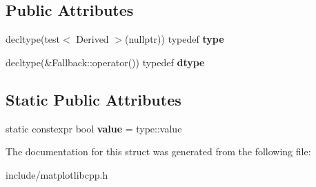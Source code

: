 \subsection*{Public Attributes}
\begin{DoxyCompactItemize}
\item 
decltype(test$<$ Derived $>$(nullptr)) typedef {\bfseries type}\hypertarget{structmatplotlibcpp_1_1detail_1_1is__callable__impl_3_01true_00_01T_01_4_ab3b84ab99dcdc4a7de6497c5b0985216}{}\label{structmatplotlibcpp_1_1detail_1_1is__callable__impl_3_01true_00_01T_01_4_ab3b84ab99dcdc4a7de6497c5b0985216}

\item 
decltype(\&Fallback\+::operator()) typedef {\bfseries dtype}\hypertarget{structmatplotlibcpp_1_1detail_1_1is__callable__impl_3_01true_00_01T_01_4_aedc864521ba0dc4e9e01eb1d8a32bcbc}{}\label{structmatplotlibcpp_1_1detail_1_1is__callable__impl_3_01true_00_01T_01_4_aedc864521ba0dc4e9e01eb1d8a32bcbc}

\end{DoxyCompactItemize}
\subsection*{Static Public Attributes}
\begin{DoxyCompactItemize}
\item 
static constexpr bool {\bfseries value} = type\+::value\hypertarget{structmatplotlibcpp_1_1detail_1_1is__callable__impl_3_01true_00_01T_01_4_a254367a81240c8cfc1c281043210076f}{}\label{structmatplotlibcpp_1_1detail_1_1is__callable__impl_3_01true_00_01T_01_4_a254367a81240c8cfc1c281043210076f}

\end{DoxyCompactItemize}


The documentation for this struct was generated from the following file\+:\begin{DoxyCompactItemize}
\item 
include/matplotlibcpp.\+h\end{DoxyCompactItemize}
